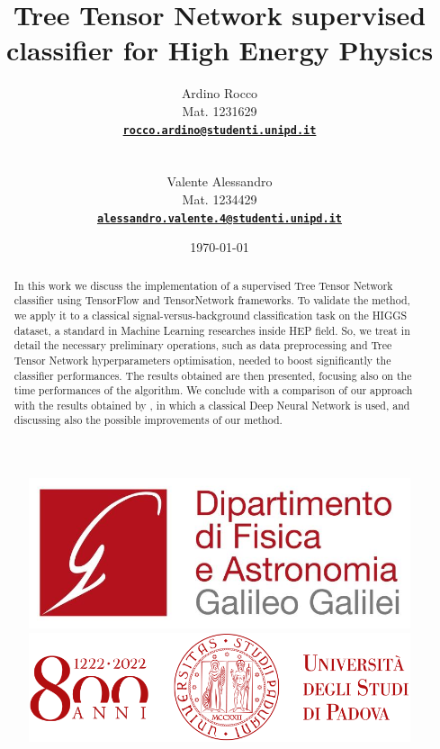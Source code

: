 \begin{figure}[H]
    \begin{minipage}{0.25\linewidth}
        \includegraphics[width=\linewidth]{titlepage/images/logo_DFA.jpg}
    \end{minipage}
    \hfill
    \begin{minipage}{0.35\linewidth}
        \includegraphics[width=\textwidth]{titlepage/images/logo_800anni.png}
    \end{minipage}
\end{figure}

\vspace{-20pt}
\noindent\makebox[\linewidth]{\color{linescolor} \rule[-0.2cm]{0.85\paperwidth}{1.2 pt}}
\noindent\makebox[\linewidth]{\color{linescolor} \rule[0.3cm]{0.85\paperwidth}{1pt}}

\title{Tree Tensor Network supervised classifier for High Energy Physics}
\author{
    \parbox{3.25cm}{Ardino Rocco}       \parbox{2.5cm}{Mat. 1231629} \parbox{6.0cm}{\bf\href{mailto:rocco.ardino@studenti.unipd.it}{\texttt{rocco.ardino@studenti.unipd.it}}}          \\
    \parbox{3.25cm}{Valente Alessandro} \parbox{2.5cm}{Mat. 1234429} \parbox{6.0cm}{\bf\href{mailto:alessandro.valente.4@studenti.unipd.it}{\texttt{alessandro.valente.4@studenti.unipd.it}}}
}
\date{\today}

\begin{abstract}
    In this work we discuss the implementation of a supervised Tree Tensor Network classifier using TensorFlow and TensorNetwork frameworks. To validate the method, we apply it to a classical signal-versus-background classification task on the HIGGS dataset, a standard in Machine Learning researches inside HEP field. So, we treat in detail the necessary preliminary operations, such as data preprocessing and Tree Tensor Network hyperparameters optimisation, needed to boost significantly the classifier performances. The results obtained are then presented, focusing also on the time performances of the algorithm. We conclude with a comparison of our approach with the results obtained by \cite{baldi}, in which a classical Deep Neural Network is used, and discussing also the possible improvements of our method.
\end{abstract}

